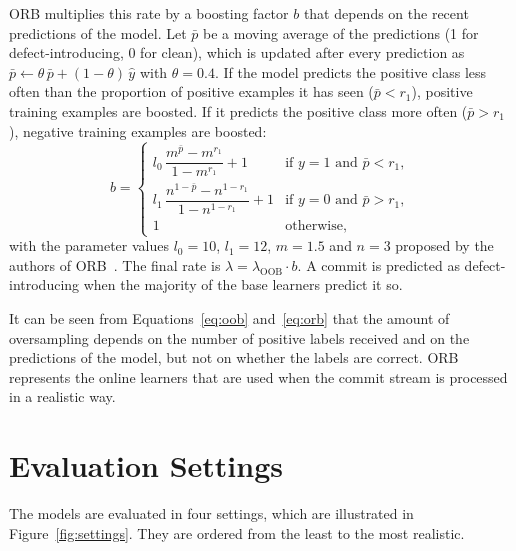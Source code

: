 \documentclass[12pt,a4paper,oneside]{report}
\begin{document}
ORB multiplies this rate by a boosting factor $b$ that depends on the recent
predictions of the model. Let $\bar{p}$ be a moving average of the
predictions (1 for defect-introducing, 0 for clean), which is updated after
every prediction as $\bar{p} \leftarrow \theta\,\bar{p} + (1-\theta)\,\hat{y}$
with $\theta = 0.4$. If the model predicts the positive class less often than
the proportion of positive examples it has seen ($\bar{p} < r_1$), positive
training examples are boosted. If it predicts the positive class more often
($\bar{p} > r_1$), negative training examples are boosted:
\begin{equation}
b =
\begin{cases}
l_0\,\dfrac{m^{\bar{p}} - m^{r_1}}{1 - m^{r_1}} + 1 & \text{if } y=1 \text{ and } \bar{p} < r_1,\\[2.2ex]
l_1\,\dfrac{n^{1-\bar{p}} - n^{1-r_1}}{1 - n^{1-r_1}} + 1 & \text{if } y=0 \text{ and } \bar{p} > r_1,\\[1.6ex]
1 & \text{otherwise,}
\end{cases}
\label{eq:orb}
\end{equation}
with the parameter values $l_0 = 10$, $l_1 = 12$, $m = 1.5$ and $n = 3$
proposed by the authors of ORB~\cite{cabral2019orb}. The final rate is
$\lambda = \lambda_{\mathrm{OOB}} \cdot b$. A commit is predicted as
defect-introducing when the majority of the base learners predict it so.

It can be seen from Equations~\ref{eq:oob} and~\ref{eq:orb} that the amount
of oversampling depends on the number of positive labels received and on the
predictions of the model, but not on whether the labels are correct. ORB
represents the online learners that are used when the commit stream is
processed in a realistic way.

\section{Evaluation Settings}\label{sec:settings}

The models are evaluated in four settings, which are illustrated in
Figure~\ref{fig:settings}. They are ordered from the least to the most
realistic.
\end{document}
